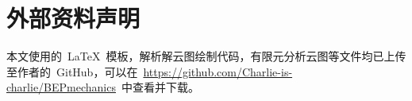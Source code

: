 \chapter{外部资料声明}
\label{cha:statement}
本文使用的~\LaTeX{}~模板，解析解云图绘制代码，有限元分析云图等文件均已上传至作者的~GitHub，可以在~\url{https://github.com/Charlie-is-charlie/BEPmechanics}~中查看并下载。
